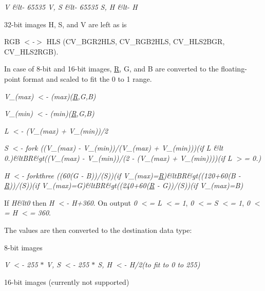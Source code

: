 {\itshape V \&lt-\/ 65535 V, S \&lt-\/ 65535 S, H \&lt-\/ H}


\begin{DoxyItemize}
\item 32-\/bit images H, S, and V are left as is 
\item R\+GB {\itshape $<$-\/$>$} H\+LS ({\ttfamily C\+V\+\_\+\+B\+G\+R2\+H\+LS, C\+V\+\_\+\+R\+G\+B2\+H\+LS, C\+V\+\_\+\+H\+L\+S2\+B\+GR, C\+V\+\_\+\+H\+L\+S2\+R\+GB}). 
\end{DoxyItemize}

In case of 8-\/bit and 16-\/bit images, \mbox{\hyperlink{classorg_1_1opencv_1_1_r}{R}}, G, and B are converted to the floating-\/point format and scaled to fit the 0 to 1 range.

{\itshape V\+\_\+(max) $<$-\/ (max)(\mbox{\hyperlink{classorg_1_1opencv_1_1_r}{R}},G,B)}

{\itshape V\+\_\+(min) $<$-\/ (min)(\mbox{\hyperlink{classorg_1_1opencv_1_1_r}{R}},G,B)}

{\itshape L $<$-\/ (V\+\_\+(max) + V\+\_\+(min))/2}

{\itshape S $<$-\/ fork ((V\+\_\+(max) -\/ V\+\_\+(min))/(V\+\_\+(max) + V\+\_\+(min)))(if L \&lt 0.)\&lt\+BR\&gt((V\+\_\+(max) -\/ V\+\_\+(min))/(2 -\/ (V\+\_\+(max) + V\+\_\+(min))))(if L $>$= 0.)}

{\itshape H $<$-\/ forkthree ((60(G -\/ B))/(S))(if V\+\_\+(max)=\mbox{\hyperlink{classorg_1_1opencv_1_1_r}{R}})\&lt\+BR\&gt((120+60(B -\/ \mbox{\hyperlink{classorg_1_1opencv_1_1_r}{R}}))/(S))(if V\+\_\+(max)=G)\&lt\+BR\&gt((240+60(\mbox{\hyperlink{classorg_1_1opencv_1_1_r}{R}} -\/ G))/(S))(if V\+\_\+(max)=B)}

If {\itshape H\&lt0} then {\itshape H $<$-\/ H+360}. On output {\itshape 0 $<$= L $<$= 1}, {\itshape 0 $<$= S $<$= 1}, {\itshape 0 $<$= H $<$= 360}.

The values are then converted to the destination data type\+:


\begin{DoxyItemize}
\item 8-\/bit images 
\end{DoxyItemize}

{\itshape V $<$-\/ 255 $\ast$ V, S $<$-\/ 255 $\ast$ S, H $<$-\/ H/2(to fit to 0 to 255)}


\begin{DoxyItemize}
\item 16-\/bit images (currently not supported) 
\end{DoxyItemize}

